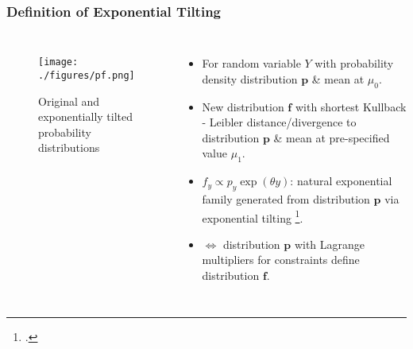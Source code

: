 \documentclass[hyperref={bookmarks=false},aspectratio=169]{beamer}
\begin{document}
\begin{frame}
\frametitle{Definition of Exponential Tilting}

\begin{columns}


\begin{figure}
    \centering
    \texttt{[image: ./figures/pf.png]}
    \caption{Original and exponentially tilted probability distributions}
    \label{fig:OriginalETPMF1}
\end{figure}

\begin{itemize}
    \item For random variable $Y$ with probability density distribution $\boldsymbol{p}$ {\&} mean at $\mu_0$.
    \item New distribution $\boldsymbol{f}$ with shortest Kullback - Leibler distance/divergence to distribution $\boldsymbol{p}$ {\&} mean at pre-specified value $\mu_1$.
    \item $f_y \propto p_y  \exp (\theta y)$: natural exponential family generated from distribution $\boldsymbol{p}$ via exponential tilting \footcite{EETCarloCamarda}.
    \item $\Longleftrightarrow$ distribution $\boldsymbol{p}$ with Lagrange multipliers for constraints define distribution $\boldsymbol{f}$.
\end{itemize}

\end{columns}
\end{frame}
\end{document}
